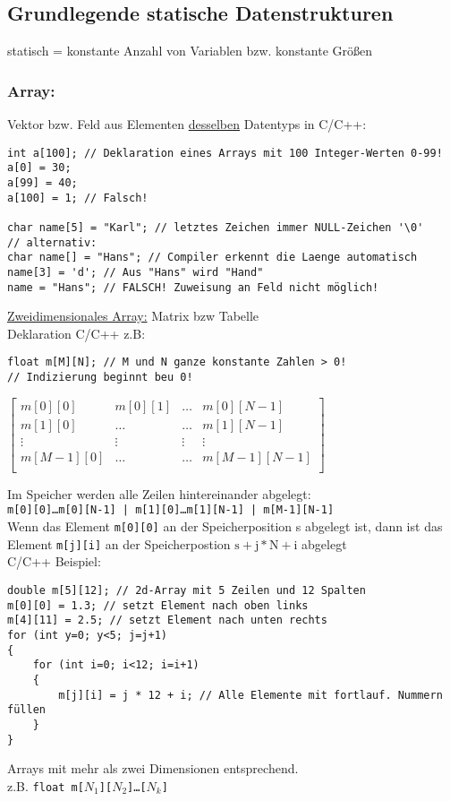 \subsection{Grundlegende statische Datenstrukturen}
statisch = konstante Anzahl von Variablen bzw. konstante Größen \\
\subsubsection{Array:} Vektor bzw. Feld aus Elementen \underline{desselben} Datentyps
in C/C++:
\begin{lstlisting}
int a[100]; // Deklaration eines Arrays mit 100 Integer-Werten 0-99!
a[0] = 30;
a[99] = 40;
a[100] = 1; // Falsch!

char name[5] = "Karl"; // letztes Zeichen immer NULL-Zeichen '\0'
// alternativ:
char name[] = "Hans"; // Compiler erkennt die Laenge automatisch
name[3] = 'd'; // Aus "Hans" wird "Hand"
name = "Hans"; // FALSCH! Zuweisung an Feld nicht möglich!
\end{lstlisting}
\underline{Zweidimensionales Array:} Matrix bzw Tabelle \\
Deklaration C/C++ z.B:
\begin{lstlisting}
float m[M][N]; // M und N ganze konstante Zahlen > 0!
// Indizierung beginnt beu 0!
\end{lstlisting}
\begin{center}
$\begin{bmatrix}
m[0][0] & m[0][1] & \dots & m[0][N-1]	\\
m[1][0] 	& \dots	& \dots & m[1][N-1]	\\
\vdots 	& \vdots	& \vdots & \vdots	\\
m[M-1][0] & \dots & \dots & m[M-1][N-1] \\
\end{bmatrix}$
\end{center} 

Im Speicher werden alle Zeilen hintereinander abgelegt: \\
\texttt{m[0][0]\dots m[0][N-1] | m[1][0]\dots m[1][N-1] | m[M-1][N-1]} \\
Wenn das Element \texttt{m[0][0]} an der Speicherposition s abgelegt ist, dann ist das Element \texttt{m[j][i]} an der Speicherpostion 
$\mbox{s} + \mbox{j}*\mbox{N}+\mbox{i}$ abgelegt \\
C/C++ Beispiel:
\begin{lstlisting}
double m[5][12]; // 2d-Array mit 5 Zeilen und 12 Spalten
m[0][0] = 1.3; // setzt Element nach oben links
m[4][11] = 2.5; // setzt Element nach unten rechts
for (int y=0; y<5; j=j+1)
{
	for (int i=0; i<12; i=i+1)
	{
		m[j][i] = j * 12 + i; // Alle Elemente mit fortlauf. Nummern füllen
	}
}
\end{lstlisting}
Arrays mit mehr als zwei Dimensionen entsprechend. \\
z.B. \texttt{float m[$N_1$][$N_2$]\dots [$N_k$]}

